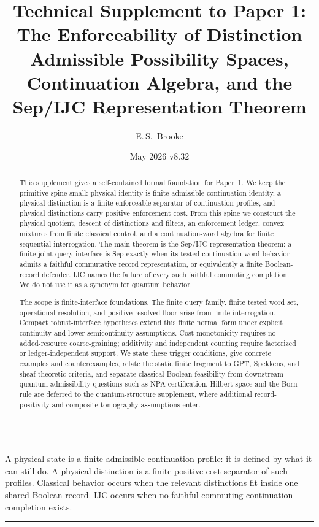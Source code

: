 \documentclass[11pt]{article}
\title{Technical Supplement to Paper 1:\\
The Enforceability of Distinction\\[2pt]
\large Admissible Possibility Spaces, Continuation Algebra, and the Sep/IJC Representation Theorem}
\author{E.\,S.\ Brooke}
\date{May 2026 \quad\textbar\quad v8.32}
\newenvironment{apfbox}{\par\medskip\hrule\vspace{0.5em}}{\vspace{0.5em}\hrule\par\medskip}
\begin{document}
\maketitle

\begin{abstract}
This supplement gives a self-contained formal foundation for Paper~1. We keep the primitive spine small: physical identity is finite admissible continuation identity, a physical distinction is a finite enforceable separator of continuation profiles, and physical distinctions carry positive enforcement cost. From this spine we construct the physical quotient, descent of distinctions and filters, an enforcement ledger, convex mixtures from finite classical control, and a continuation-word algebra for finite sequential interrogation. The main theorem is the Sep/IJC representation theorem: a finite joint-query interface is Sep exactly when its tested continuation-word behavior admits a faithful commutative record representation, or equivalently a finite Boolean-record defender. IJC names the failure of every such faithful commuting completion. We do not use it as a synonym for quantum behavior.

The scope is finite-interface foundations. The finite query family, finite tested word set, operational resolution, and positive resolved floor arise from finite interrogation. Compact robust-interface hypotheses extend this finite normal form under explicit continuity and lower-semicontinuity assumptions. Cost monotonicity requires no-added-resource coarse-graining; additivity and independent counting require factorized or ledger-independent support. We state these trigger conditions, give concrete examples and counterexamples, relate the static finite fragment to GPT, Spekkens, and sheaf-theoretic criteria, and separate classical Boolean feasibility from downstream quantum-admissibility questions such as NPA certification. Hilbert space and the Born rule are deferred to the quantum-structure supplement, where additional record-positivity and composite-tomography assumptions enter.
\end{abstract}

\begin{apfbox}
A physical state is a finite admissible continuation profile: it is defined by what it can still do. A physical distinction is a finite positive-cost separator of such profiles. Classical behavior occurs when the relevant distinctions fit inside one shared Boolean record. IJC occurs when no faithful commuting continuation completion exists.
\end{apfbox}
\end{document}
